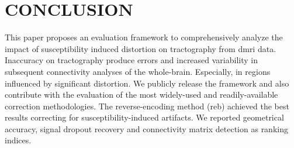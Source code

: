 \section{CONCLUSION}

This paper proposes an evaluation framework to
comprehensively analyze the impact of susceptibility
induced distortion on tractography from \gls*{dmri}
data. Inaccuracy on tractography produce errors
and increased variability in subsequent connectivity 
analyses of the whole-brain. Especially, in regions 
influenced by  significant distortion.
We publicly release the framework and also contribute
with the evaluation of the most widely-used and
readily-available correction methodologies. 
The reverse-encoding method (\gls*{reb}) achieved the
best results correcting for susceptibility-induced 
artifacts. We reported geometrical accuracy, signal
dropout recovery and connectivity matrix detection as
ranking indices.